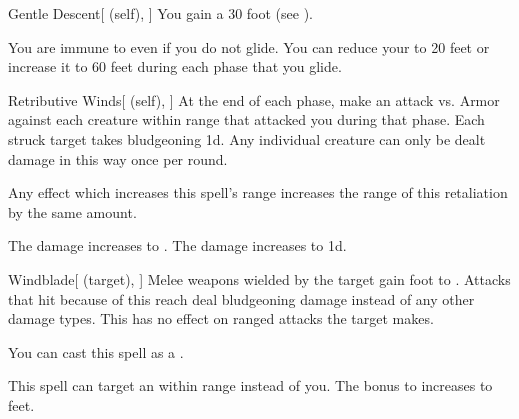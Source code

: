 \lowercase{\hypertarget{spell:Gentle Descent}{}}\label{spell:Gentle Descent}
\begin{attuneability}[Rank 3]{\hypertarget{spell:Gentle Descent}{Gentle Descent}}[ (self), ]
You gain a 30 foot  (see ).

\rankline
{} You are immune to  even if you do not glide.
 You can reduce your  to 20 feet or increase it to 60 feet during each phase that you glide.

\end{attuneability}
\vspace{0.25em}



\lowercase{\hypertarget{spell:Retributive Winds}{}}\label{spell:Retributive Winds}
\begin{attuneability}[Rank 3]{\hypertarget{spell:Retributive Winds}{Retributive Winds}}[ (self), ]
At the end of each phase, make an attack vs. Armor against each creature within \rngclose range that attacked you during that phase.
\hit Each struck target takes bludgeoning  \minus1d.
Any individual creature can only be dealt damage in this way once per round.

Any effect which increases this spell's range increases the range of this retaliation by the same amount.

\rankline
{} The damage increases to .
 The damage increases to  \plus1d.

\end{attuneability}
\vspace{0.25em}



\lowercase{\hypertarget{spell:Windblade}{}}\label{spell:Windblade}
\begin{attuneability}[Rank 3]{\hypertarget{spell:Windblade}{Windblade}}[ (target), ]
Melee weapons wielded by the target gain  foot  to .
Attacks that hit because of this reach deal bludgeoning damage instead of any other damage types.
This has no effect on ranged attacks the target makes.

You can cast this spell as a .

\rankline
{} This spell can target an  within \rngmed range instead of you.
 The bonus to  increases to  feet.

\end{attuneability}
\vspace{0.25em}



